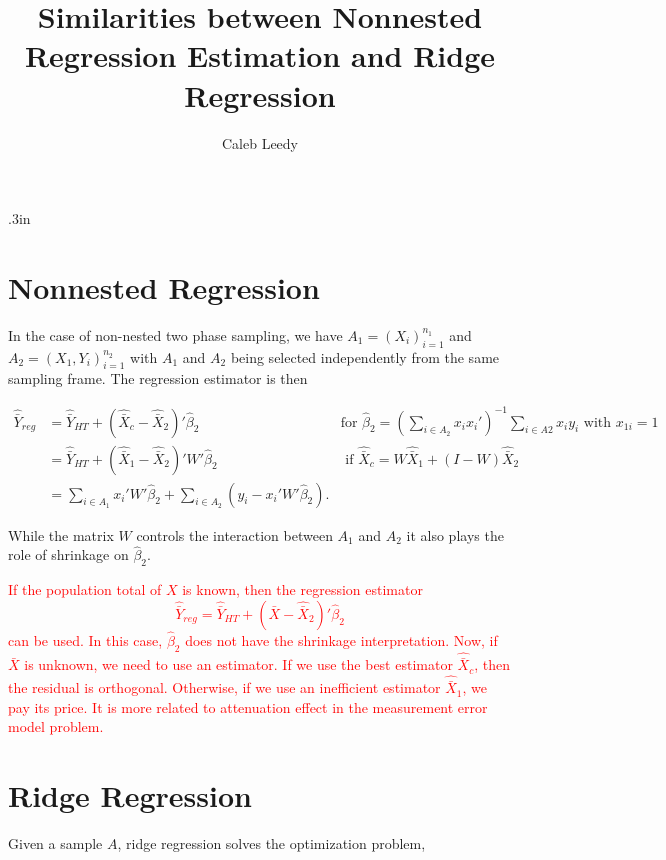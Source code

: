 \documentclass[12pt]{article}
\begin{document}
\title{Similarities between Nonnested Regression Estimation and Ridge Regression}
\author{Caleb Leedy}
\maketitle 

\baselineskip .3in

\section{Nonnested Regression}

In the case of non-nested two phase sampling, we have $A_1 = (X_i)_{i = 1}^{n_1}$
and $A_2 = (X_1, Y_i)_{i = 1}^{n_2}$ with $A_1$ and $A_2$ being selected
independently from the same sampling frame. The regression estimator is then

\begin{align*}
\hat{\bar{Y}}_{reg} 
  &= \hat{\bar{Y}}_{HT} + (\hat{\bar{X}}_c - \hat{\bar{X}}_2)' \hat \beta_2 
  & \text{for } \hat \beta_2 = \left(\sum_{i \in A_2} x_i x_i'\right)^{-1} 
    \sum_{i \in A2} x_i y_i \text{ with } x_{1i} = 1 \\
  &= \hat{\bar{Y}}_{HT} + (\hat{\bar{X}}_1 - \hat{\bar{X}}_2)'W'\hat \beta_2 
  & \text{ if } \hat{\bar{X}}_c = W \hat{\bar{X}}_1 + (I - W) \hat{\bar{X}}_2\\
  &= \sum_{i \in A_1} x_i' W' \hat \beta_2 + \sum_{i \in A_2} (y_i - x_i' W'
  \hat \beta_2).
\end{align*}

While the matrix $W$ controls the interaction between $A_1$ and $A_2$ it also
plays the role of shrinkage on $\hat \beta_2$.


\textcolor{red}{If the population total of $X$ is known, then the regression estimator $$ \hat{\bar{Y}}_{reg} 
  = \hat{\bar{Y}}_{HT} + ({\bar{X}} - \hat{\bar{X}}_2)' \hat \beta_2$$
  can be used. In this case, $\hat{\beta}_2$ does not have the shrinkage interpretation. Now, if $\bar{X}$ is unknown, we need to use an estimator. If we use the best estimator $\hat{\bar{X}}_c$, then the residual is orthogonal. Otherwise, if we use an inefficient estimator $\hat{\bar{X}}_1$, we pay its price. It is more related to attenuation effect in the measurement error model problem. 
  }
\section{Ridge Regression}

Given a sample $A$, ridge regression solves the optimization problem,
\end{document}
